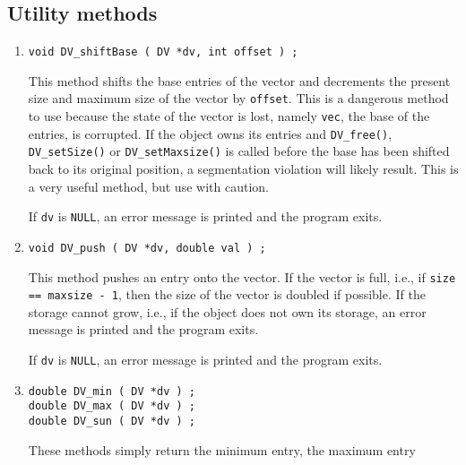 \subsection{Utility methods}
\label{subsection:DV:proto:utilities}
\par
\par
\begin{enumerate}
\item
\begin{verbatim}
void DV_shiftBase ( DV *dv, int offset ) ;
\end{verbatim}
This method shifts the base entries of the vector and decrements
the present size and maximum size of the vector by {\tt offset}.
This is a dangerous method to use because the state of the vector
is lost, namely {\tt vec}, the base of the entries, is corrupted.
If the object owns its entries and {\tt DV\_free()}, 
{\tt DV\_setSize()} or {\tt DV\_setMaxsize()} is called before 
the base has been shifted back to
its original position, a segmentation violation will likely result.
This is a very useful method, but use with caution.
\par {}
If {\tt dv} is {\tt NULL}, 
an error message is printed and the program exits.
\item
\begin{verbatim}
void DV_push ( DV *dv, double val ) ;
\end{verbatim}
This method pushes an entry onto the vector.
If the vector is full, i.e., if {\tt size == maxsize - 1},
then the size of the vector is doubled if possible.
If the storage cannot grow, i.e., if the object does not own its
storage, an error message is printed and the program exits.
\par {}
If {\tt dv} is {\tt NULL}, 
an error message is printed and the program exits.
\item
\begin{verbatim}
double DV_min ( DV *dv ) ;
double DV_max ( DV *dv ) ;
double DV_sun ( DV *dv ) ;
\end{verbatim}
These methods simply return the minimum entry, the maximum entry 

\end{enumerate}
